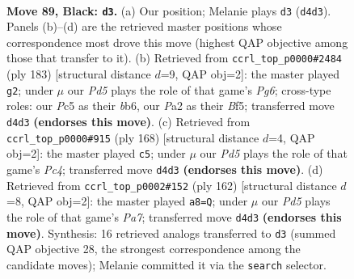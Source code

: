 \documentclass[11pt]{article}
\begin{document}
\clearpage

\begin{figure}[p]\centering
\begin{subfigure}{0.46\textwidth}\centering
\resizebox{\linewidth}{!}{%
\newchessgame
\chessboard[
  setfen={8/8/8/2p1k3/3p4/7K/p7/8 b - - 0 89},
  showmover=false,
  pgfstyle=straightmove, color=movearrow, markmove={d4-d3}
]}
\caption{}
\end{subfigure}\hfill
\begin{subfigure}{0.46\textwidth}\centering
\resizebox{\linewidth}{!}{%
\newchessgame
\chessboard[
  setfen={8/8/1B6/3p1b2/8/5kp1/8/4K3 b - - 17 92},
  showmover=false,
  pgfstyle=straightmove, color=movearrow, markmove={g3-g2}
]}
\caption{}
\end{subfigure}
\\[4pt]
\begin{subfigure}{0.46\textwidth}\centering
\resizebox{\linewidth}{!}{%
\newchessgame
\chessboard[
  setfen={8/6R1/1P6/8/2P5/k2K1P2/8/8 w - - 1 85},
  showmover=false,
  pgfstyle=straightmove, color=movearrow, markmove={c4-c5}
]}
\caption{}
\end{subfigure}\hfill
\begin{subfigure}{0.46\textwidth}\centering
\resizebox{\linewidth}{!}{%
\newchessgame
\chessboard[
  setfen={8/P7/K5p1/8/8/1P4k1/4p3/8 w - - 7 82},
  showmover=false,
  pgfstyle=straightmove, color=movearrow, markmove={a7-a8}
]}
\caption{}
\end{subfigure}
\caption{\textbf{Move 89, Black: \texttt{d3}.} (a) Our position; Melanie plays \texttt{d3} (\texttt{d4d3}). Panels (b)--(d) are the retrieved master positions whose correspondence most drove this move (highest QAP objective among those that transfer to it). (b) Retrieved from \texttt{ccrl\_top\_p0000\#2484} (ply 183) [structural distance $d$=9, QAP obj=2]: the master played \texttt{g2}; under $\mu$ our \emph{Pd5} plays the role of that game's \emph{Pg6}; cross-type roles: our \emph{P}c5 as their \emph{b}b6, our \emph{P}a2 as their \emph{B}f5; transferred move \texttt{d4d3} \textbf{(endorses this move)}. (c) Retrieved from \texttt{ccrl\_top\_p0000\#915} (ply 168) [structural distance $d$=4, QAP obj=2]: the master played \texttt{c5}; under $\mu$ our \emph{Pd5} plays the role of that game's \emph{Pc4}; transferred move \texttt{d4d3} \textbf{(endorses this move)}. (d) Retrieved from \texttt{ccrl\_top\_p0002\#152} (ply 162) [structural distance $d$=8, QAP obj=2]: the master played \texttt{a8=Q}; under $\mu$ our \emph{Pd5} plays the role of that game's \emph{Pa7}; transferred move \texttt{d4d3} \textbf{(endorses this move)}. Synthesis: 16 retrieved analogs transferred to \texttt{d3} (summed QAP objective 28, the strongest correspondence among the candidate moves); Melanie committed it via the \texttt{search} selector.}
\label{fig:thought-m177}
\end{figure}
\end{document}
